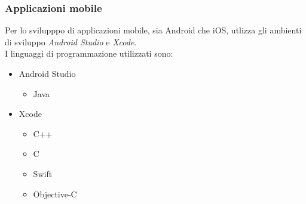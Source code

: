 \subsubsection{Applicazioni mobile}
Per lo svilupppo di applicazioni mobile, sia Android che iOS, \lab{} utlizza gli ambienti di sviluppo \textit{Android Studio} e \textit{Xcode}.
\\I linguaggi di programmazione utilizzati sono:
\begin{itemize}
\item Android Studio
	\begin{itemize}
		\item Java
	\end{itemize}
\item Xcode
	\begin{itemize}
		\item C++
		\item C
		\item Swift
		\item Objective-C
	\end{itemize}
\end{itemize}

